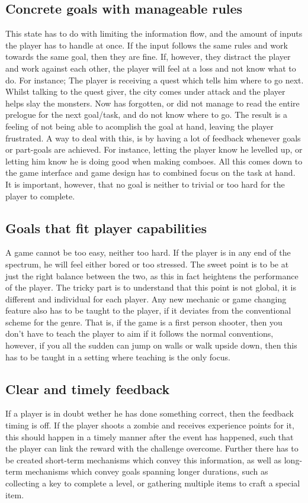 \subsection{Concrete goals with manageable rules}
This state has to do with limiting the information flow, and the amount of inputs the player has to handle at once. If the input follows the same rules and work towards the same goal, then they are fine. If, however, they distract the player and work against each other, the player will feel at a loss and not know what to do. For instance; The player is receiving a quest which tells him where to go next. Whilst talking to the quest giver, the city comes under attack and the player helps slay the monsters. Now has forgotten, or did not manage to read the entire prelogue for the next goal/task, and do not know where to go. The result is a feeling of not being able to acomplish the goal at hand, leaving the player frustrated.
A way to deal with this, is by having a lot of feedback whenever goals or part-goals are achieved. For instance, letting the player know he levelled up, or letting him know he is doing good when making comboes. All this comes down to the game interface and game design has to combined focus on the task at hand. It is important, however, that no goal is neither to trivial or too hard for the player to complete.

\subsection{Goals that fit player capabilities}
A game cannot be too easy, neither too hard. If the player is in any end of the spectrum, he will feel either bored or too stressed. The sweet point is to be at just the right balance between the two, as this in fact heightens the performance of the player. The tricky part is to understand that this point is not global, it is different and individual for each player. Any new mechanic or game changing feature also has to be taught to the player, if it deviates from the conventional scheme for the genre. That is, if the game is a first person shooter, then you don't have to teach the player to aim if it follows the normal conventions, however, if you all the sudden can jump on walls or walk upside down, then this has to be taught in a setting where teaching is the only focus.

\subsection{Clear and timely feedback}
If a player is in doubt wether he has done something correct, then the feedback timing is off. If the player shoots a zombie and receives experience points for it, this should happen in a timely manner after the event has happened, such that the player can link the reward with the challenge overcome. Further there has to be created short-term mechanisms which convey this information, as well as long-term mechanisms which convey goals spanning longer durations, such as collecting a key to complete a level, or gathering multiple items to craft a special item.

